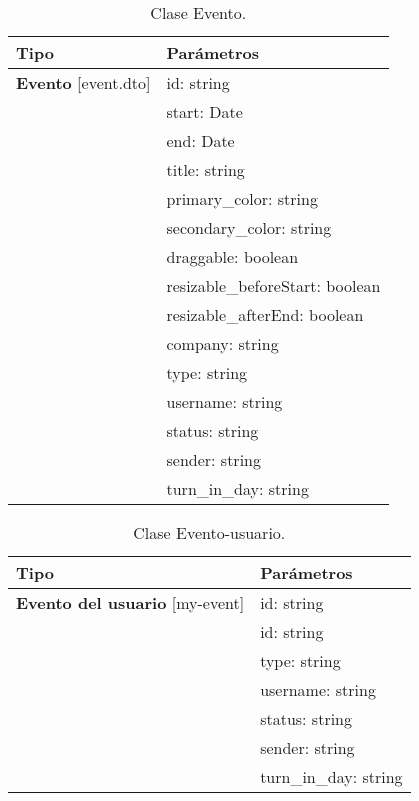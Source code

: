 \begin{itemize}
\begin{table}[H]
\centering
\begin{tabular}{|l|l|}
\hline
Tipo  & Parámetros  \\
\hline \hline
\textbf{Evento} [event.dto] & id: string \\ 
    & start: Date \\
    & end: Date \\
    & title: string \\
  & primary\_color: string \\
  & secondary\_color: string \\
  & draggable: boolean \\
  & resizable\_beforeStart: boolean \\
  & resizable\_afterEnd: boolean \\
  & company: string \\
  & type: string \\
  & username: string \\
  & status: string \\ 
  & sender: string\\
  & turn\_in\_day: string \\ \hline
\end{tabular}
\caption{Clase Evento.}
\end{table}







\begin{table}[H]
\centering
\begin{tabular}{|l|l|}
\hline
Tipo  & Parámetros  \\
\hline \hline
\textbf{Evento del usuario} [my-event] & id: string \\ 
  & id: string \\ 
 & type: string \\ 
  & username: string \\ 
 & status: string \\  
 & sender: string \\ 
  & turn\_in\_day: string\\ \hline
\end{tabular}
\caption{Clase Evento-usuario.}
\end{table}






\end{itemize}
